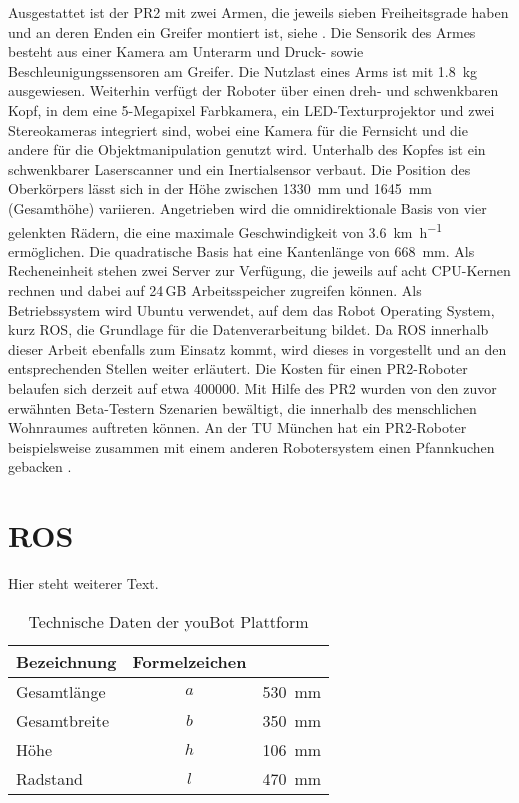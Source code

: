 Ausgestattet ist der PR2 mit zwei Armen, die jeweils sieben Freiheitsgrade haben und an deren Enden ein Greifer montiert ist, siehe . Die Sensorik des Armes besteht aus einer Kamera am Unterarm und Druck- sowie Beschleunigungssensoren am Greifer. Die Nutzlast eines Arms ist mit \SI{1,8}{kg} ausgewiesen. Weiterhin verfügt der Roboter über einen dreh- und schwenkbaren Kopf, in dem eine 5-Megapixel Farbkamera, ein LED-Texturprojektor und zwei Stereokameras integriert sind, wobei eine Kamera für die Fernsicht und die andere für die Objektmanipulation genutzt wird. Unterhalb des Kopfes ist ein schwenkbarer Laserscanner und ein Inertialsensor verbaut. Die Position des Oberkörpers lässt sich in der Höhe zwischen \SI{1330}{mm} und \SI{1645}{mm} (Gesamthöhe) variieren. Angetrieben wird die omnidirektionale Basis von vier gelenkten Rädern, die eine maximale Geschwindigkeit von \SI{3,6}{\kilo\metre\per\hour} ermöglichen. Die quadratische Basis hat eine Kantenlänge von \SI{668}{mm}. Als Recheneinheit stehen zwei Server zur Verfügung, die jeweils auf acht CPU-Kernen rechnen und dabei auf 24\,GB Arbeitsspeicher zugreifen können. Als Betriebssystem wird Ubuntu verwendet, auf dem das Robot Operating System, kurz ROS, die Grundlage für die Datenverarbeitung bildet. Da ROS innerhalb dieser Arbeit ebenfalls zum Einsatz kommt, wird dieses in  vorgestellt und an den entsprechenden Stellen weiter erläutert. Die Kosten für einen PR2-Roboter belaufen sich derzeit auf etwa \SI{400 000}{}\footnotemark. Mit Hilfe des PR2 wurden von den zuvor erwähnten Beta-Testern Szenarien bewältigt, die innerhalb des menschlichen Wohnraumes auftreten können. An der TU München hat ein PR2-Roboter beispielsweise zusammen mit einem anderen Robotersystem einen Pfannkuchen gebacken \cite{TUM2011}.

\section{ROS}
\label{sec.ROS}

Hier steht weiterer Text.

\begin{table}
	\centering
	\caption{Technische Daten der youBot Plattform}\label{tab.TechSpecYouBotBase}
	\vspace*{-3mm}
	\begin{tabular}{lcr}
        \toprule
		Bezeichnung		& Formelzeichen	&              \\
		\midrule
		Gesamtlänge 	& $a$           & \SI{530}{mm} \\
		\rowcolor{Snow2}
		Gesamtbreite 	& $b$           & \SI{350}{mm} \\
		Höhe			& $h$           & \SI{106}{mm} \\
		Radstand		& $l$           & \SI{470}{mm} \\
		\bottomrule
	\end{tabular} 
\end{table}

